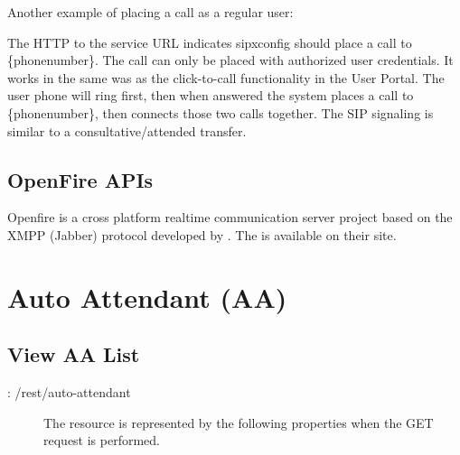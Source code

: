 \documentclass[letterpaper,10pt,english]{sphinxmanual}
\begin{document}
\begin{sphinxVerbatim}[commandchars=\\\{\}]
  
\end{sphinxVerbatim}

Another example of placing a call as a regular user:

\begin{sphinxVerbatim}[commandchars=\\\{\}]
    
\end{sphinxVerbatim}

The HTTP  to the service URL indicates sipxconfig should place a call to \{phonenumber\}. The call can only be placed with authorized user credentials. It works in the same was as the click-to-call functionality in the User Portal. The user phone will ring first, then when answered the system places a call to \{phonenumber\}, then connects those two calls together. The SIP signaling is similar to a consultative/attended transfer.


\subsection{OpenFire APIs}
\label{\detokenize{restapi:openfire-apis}}
Openfire is a cross platform realtime communication server project based on the XMPP (Jabber) protocol developed by . The  is available on their site.


\section{Auto Attendant (AA)}
\label{\detokenize{restapi:auto-attendant-aa}}

\subsection{View AA List}
\label{\detokenize{restapi:view-aa-list}}
: /rest/auto-attendant
\begin{description}
\item[{}] \leavevmode
The resource is represented by the following properties when the GET request is performed.

\end{description}
\end{document}
